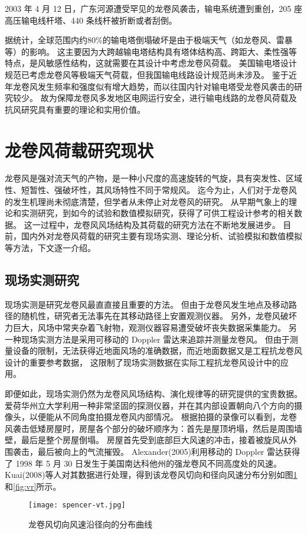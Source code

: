 2003 年 4 月 12 日，广东河源遭受罕见的龙卷风袭击，输电系统遭到重创，205 座高压输电线杆塔、440 条线杆被折断或者刮倒\cite{zhang2006shudianxian}。

据统计，全球范围内约$80\%$的输电塔倒塌破坏是由于极端天气（如龙卷风、雷暴等）的影响\cite{hamada2010finite}。
这主要因为大跨越输电塔结构具有塔体结构高、跨距大、柔性强等特点，是风敏感性结构，这就需要在其设计中考虑龙卷风荷载。
美国输电塔设计规范已考虑龙卷风等极端天气荷载，但我国输电线路设计规范尚未涉及。
鉴于近年龙卷风发生频率和强度似有增大趋势，而以往国内针对输电塔受龙卷风袭击的研究较少。
故为保障龙卷风多发地区电网运行安全，进行输电线路的龙卷风荷载及抗风研究具有重要的理论和实用价值。

\section{龙卷风荷载研究现状}
龙卷风是强对流天气的产物，是一种小尺度的高速旋转的气旋，具有突发性、区域性、短暂性、强破坏性，其风场特性不同于常规风。
迄今为止，人们对于龙卷风的发生机理尚未彻底清楚，但学者从未停止对龙卷风的研究。
从早期气象上的理论和实测研究，到如今的试验和数值模拟研究，获得了可供工程设计参考的相关数据。
这一过程中，龙卷风风场结构及其荷载的研究方法在不断地发展进步。
目前，国内外对龙卷风荷载的研究主要有现场实测、理论分析、试验模拟和数值模拟等方法，下文逐一介绍。

\subsection{现场实测研究}
现场实测是研究龙卷风最直直接且重要的方法。
但由于龙卷风发生地点及移动路径的随机性，研究者无法事先在其移动路径上安置观测仪器。
另外，龙卷风破坏力巨大，风场中常夹杂着飞射物，观测仪器容易遭受破坏丧失数据采集能力。
另一种现场实测方法是采用可移动的 Doppler 雷达来追踪并测量龙卷风。
但由于测量设备的限制，无法获得近地面风场的准确数据，而近地面数据又是工程抗龙卷风设计的重要参考数据，
这限制了现场实测数据在实际工程抗龙卷风设计中的应用。

即便如此，现场实测仍然为龙卷风风场结构、演化规律等的研究提供的宝贵数据。
爱荷华州立大学利用一种非常坚固的探测仪器，并在其内部设置朝向八个方向的摄像头，以便能从不同角度拍摄龙卷风内部情况。
根据拍摄的录像可以看到，龙卷风袭击低矮房屋时，房屋各个部分的破坏顺序为：首先是屋顶坍塌，然后是周围墙壁，最后是整个房屋倒塌。
房屋首先受到底部巨大风速的冲击，接着被旋风从外围袭击，最后被向上的气流摧毁。
Alexander(2005)\cite{alexander200530}利用移动的 Doppler 雷达获得了 1998 年 5 月 30 日发生于美国南达科他州的强龙卷风不同高度处的风速。
Kuai(2008)\cite{kuai2008cfd}等人对其数据进行处理，得到该龙卷风切向和径向风速分布分别如图\ref{fig:vt}和\ref{fig:vr}所示。
\begin{figure}[!htbp]
    \centering
    \texttt{[image: spencer-vt.jpg]}
    \caption{龙卷风切向风速沿径向的分布曲线}
    \label{fig:vt}
\end{figure}


